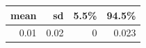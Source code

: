 
\begin{tabular}[t]{rrrr}
\toprule
mean & sd & 5.5\% & 94.5\%\\
\midrule
0.01 & 0.02 & 0 & 0.023\\
\bottomrule
\end{tabular}
